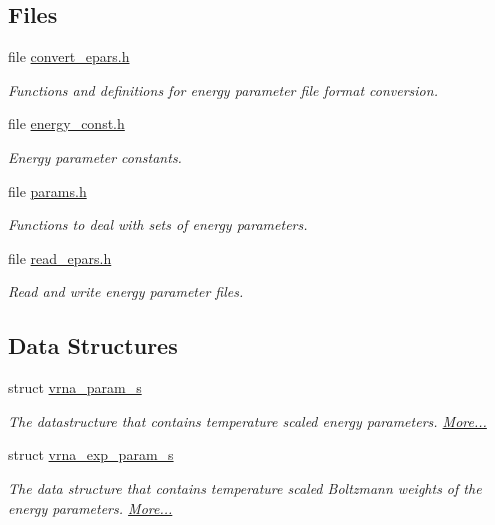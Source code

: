 \subsection*{Files}
\begin{DoxyCompactItemize}
\item 
file \mbox{\hyperlink{convert__epars_8h}{convert\+\_\+epars.\+h}}
\begin{DoxyCompactList}\small\item\em Functions and definitions for energy parameter file format conversion. \end{DoxyCompactList}\item 
file \mbox{\hyperlink{energy__const_8h}{energy\+\_\+const.\+h}}
\begin{DoxyCompactList}\small\item\em Energy parameter constants. \end{DoxyCompactList}\item 
file \mbox{\hyperlink{params_8h}{params.\+h}}
\begin{DoxyCompactList}\small\item\em Functions to deal with sets of energy parameters. \end{DoxyCompactList}\item 
file \mbox{\hyperlink{read__epars_8h}{read\+\_\+epars.\+h}}
\begin{DoxyCompactList}\small\item\em Read and write energy parameter files. \end{DoxyCompactList}\end{DoxyCompactItemize}
\subsection*{Data Structures}
\begin{DoxyCompactItemize}
\item 
struct \mbox{\hyperlink{group__energy__parameters_structvrna__param__s}{vrna\+\_\+param\+\_\+s}}
\begin{DoxyCompactList}\small\item\em The datastructure that contains temperature scaled energy parameters.  \mbox{\hyperlink{group__energy__parameters_structvrna__param__s}{More...}}\end{DoxyCompactList}\item 
struct \mbox{\hyperlink{group__energy__parameters_structvrna__exp__param__s}{vrna\+\_\+exp\+\_\+param\+\_\+s}}
\begin{DoxyCompactList}\small\item\em The data structure that contains temperature scaled Boltzmann weights of the energy parameters.  \mbox{\hyperlink{group__energy__parameters_structvrna__exp__param__s}{More...}}\end{DoxyCompactList}\end{DoxyCompactItemize}
